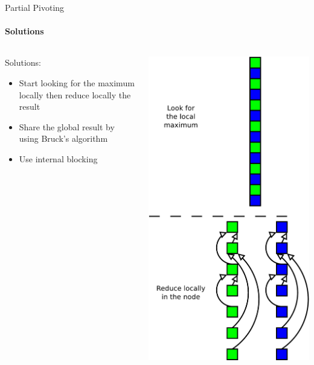 \begin{frame}{Partial Pivoting}
\framesubtitle{Solutions}
\begin{columns}
\begin{column}{.60\textwidth}
Solutions:
\begin{itemize}
\item Start looking for the maximum locally then reduce locally the result
\item Share the global result by using Bruck's algorithm
\item Use internal blocking
\end{itemize}
\end{column}
\hfill
\begin{column}{.30\textwidth}
\includegraphics[scale=0.2]{binary_reduction.pdf}
\end{column}
\end{columns}
\end{frame}

